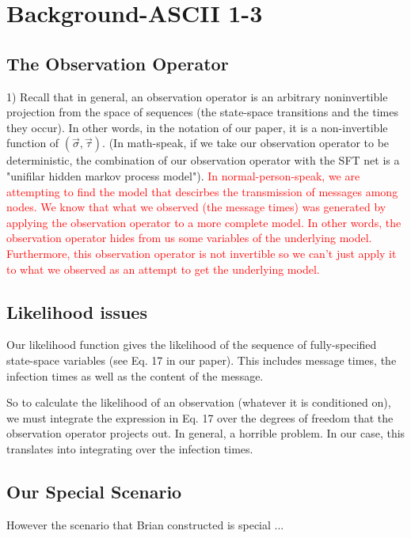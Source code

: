 \documentclass{article}
\begin{document}
\section{Background-ASCII 1-3}

\subsection{The Observation Operator}

	1) Recall that in general, an observation operator is an arbitrary
	noninvertible projection from the space of sequences (the state-space
	transitions and the times they occur). In other words, in the notation
	of our paper, it is a non-invertible function of $(\vec{\sigma},
	\vec{\tau})$. (In math-speak, if we take our observation operator to be
	deterministic, the combination of our observation operator with the
	SFT net is a "unifilar hidden markov process model").  \textcolor{red}{In
	normal-person-speak, we are attempting to find the model that descirbes
	the transmission of messages among nodes.  We know that what we
	observed (the message times) was generated  by applying the observation
	operator to a more complete model.  In other words, the observation 
        operator hides from us some variables of the underlying model.  
        Furthermore, this observation operator is not invertible so we can't 
        just apply it to what we observed as an attempt to get the underlying 
        model.}

\subsection{Likelihood issues}
        Our likelihood function gives the 
        likelihood of the sequence of fully-specified state-space variables 
        (see Eq. 17 in our paper). This includes message times, the infection times 
        as well as the content of the message.  

	So to calculate the likelihood of an observation (whatever it is
	conditioned on), we must integrate the expression in Eq. 17 over the
	degrees of freedom that the observation operator projects out. In
	general, a horrible problem. In our case, this translates
	into integrating over the infection times. 

\subsection{Our Special Scenario}	
        However the scenario that Brian constructed is special ...
\end{document}
